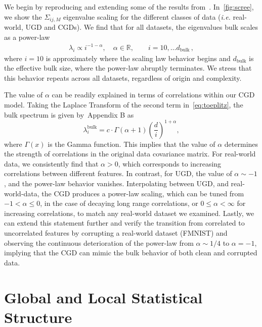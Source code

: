 \documentclass{article}
\begin{document}
We begin by reproducing and extending some of the results from~\citet{maloney2022solvable}. In~\cref{fig:scree}, we show the $\Sigma_{ij,M}$ eigenvalue scaling for the different classes of data (\textit{i.e.} real-world, UGD and CGDs). 
We find that for all datasets, the eigenvalues bulk scales as a power-law 
\begin{align}
    \lambda_i \propto i^{-1-\alpha}, 
    \quad
    \alpha \in \mathbb{R},
    \qquad
    i=10,\ldots d_\mathrm{bulk} \, ,
\end{align}
where $i=10$ is approximately where the scaling law behavior begins and $d_\mathrm{bulk}$ is the effective bulk size, where the power-law abruptly terminates.
We stress that this behavior repeats across all datasets, regardless of origin and complexity. 

The value of $\alpha$ can be readily explained in terms of correlations within our CGD model. Taking the Laplace Transform of the second term in~\cref{eq:toeplitz}, the bulk spectrum is given by~Appendix B as
\begin{equation}
    \lambda_i^\mathrm{bulk} = 
    c \cdot 
\Gamma (\alpha +1) \left(\frac{d}{ i }\right)^{1+\alpha},
\end{equation}
where $\Gamma(x)$ is the Gamma function. 
%
This implies that the value of $\alpha$ determines the strength of correlations in the original data covariance matrix.
For real-world data, we consistently find that $\alpha>0$, which corresponds to increasing correlations between different features.
In contrast, for UGD, the value of $\alpha \sim -1$, and the power-law behavior vanishes. Interpolating between UGD, and real-world-data, the CGD produces a power-law scaling, which can be tuned from $-1 < \alpha \leq 0$, in the case of decaying long range correlations, or $0 \leq \alpha < \infty$ for increasing correlations, to match any real-world dataset we examined. Lastly, we can extend this statement further and verify the transition from correlated to uncorrelated features by corrupting a real-world dataset (FMNIST) and observing the continuous deterioration of the power-law from $\alpha \sim 1/4$ to $\alpha = -1$, implying that the CGD can mimic the bulk behavior of both clean and corrupted data.




\section{Global and Local Statistical Structure}
\end{document}
